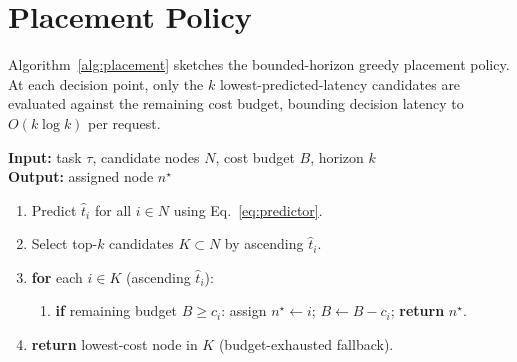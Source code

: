 \section{Placement Policy}
Algorithm~\ref{alg:placement} sketches the bounded-horizon greedy placement policy. At each decision point, only the $k$ lowest-predicted-latency candidates are evaluated against the remaining cost budget, bounding decision latency to $O(k \log k)$ per request.

\begin{tcolorbox}[
  colback=white,colframe=bitsnavy,boxrule=0.8pt,arc=2pt,
  left=10pt,right=10pt,top=8pt,bottom=8pt,
  title={Algorithm 3.1: Adaptive Latency-Aware Placement},
  fonttitle=\bfseries\color{white},colbacktitle=bitsnavy,coltitle=white,
  breakable
]
\label{alg:placement}
\small
\textbf{Input:} task $\tau$, candidate nodes $N$, cost budget $B$, horizon $k$\\
\textbf{Output:} assigned node $n^\star$
\begin{enumerate}[leftmargin=1.6em,itemsep=1pt]
  \item Predict $\hat{t}_i$ for all $i \in N$ using Eq.~\eqref{eq:predictor}.
  \item Select top-$k$ candidates $K \subset N$ by ascending $\hat{t}_i$.
  \item \textbf{for} each $i \in K$ (ascending $\hat{t}_i$):
  \begin{enumerate}[leftmargin=1.6em,itemsep=1pt]
    \item \textbf{if} remaining budget $B \geq c_i$: assign $n^\star \gets i$; $B \gets B - c_i$; \textbf{return} $n^\star$.
  \end{enumerate}
  \item \textbf{return} lowest-cost node in $K$ (budget-exhausted fallback).
\end{enumerate}
\end{tcolorbox}
